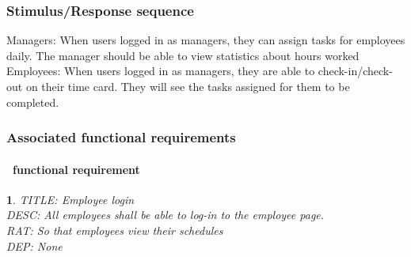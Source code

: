 \documentclass{scrreprt}
\theoremstyle{funreq}
\newtheorem{funreq}{}
\begin{document}
	
	\subsubsection{Stimulus/Response sequence}
	Managers:
	When users logged in as managers, they can assign tasks for employees daily.  The manager should be able to view statistics about hours worked
	Employees:
	When users logged in as managers, they are able to check-in/check-out on their time card. They will see the tasks assigned for them to be completed.
	
	\subsubsection{Associated functional requirements}
	\paragraph[]{\Subsectionname ~functional requirement }
	\begin{funreq}
		\label{employee_login}
		TITLE: Employee login\\
		DESC: All employees shall be able to log-in to the employee page.\\
		RAT: So that employees view their schedules\\
		DEP: None
	\end{funreq}
	
\end{document}
